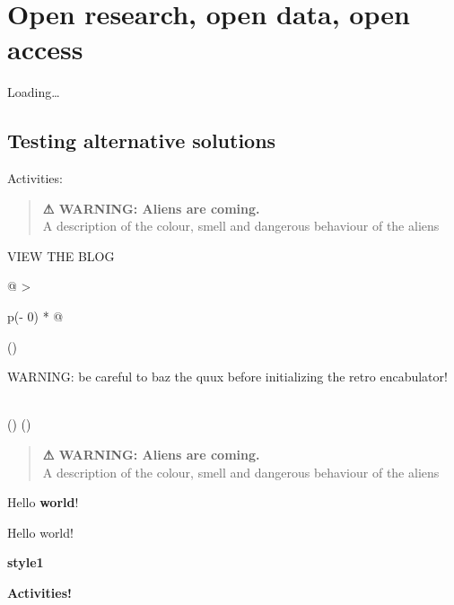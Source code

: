 \documentclass[
]{book}
\begin{document}
\hypertarget{open-research-open-data-open-access}{%
\chapter{Open research, open data, open access}\label{open-research-open-data-open-access}}

Loading\ldots{}

\hypertarget{testing-alternative-solutions}{%
\section{Testing alternative solutions}\label{testing-alternative-solutions}}

Activities:

\begin{quote}
\textbf{⚠ WARNING: Aliens are coming.}\\
A description of the colour, smell and dangerous behaviour of the aliens
\end{quote}

VIEW THE BLOG

\begin{longtable}[]{@{}
  >{\raggedright\arraybackslash}p{(\columnwidth - 0\tabcolsep) * }@{}}
\toprule()
\begin{minipage}[b]{\linewidth}\raggedright
WARNING: be careful to baz the quux before initializing the retro encabulator!
\end{minipage} \\
\midrule()
\endhead
\bottomrule()
\end{longtable}

\begin{quote}
\textbf{⚠ WARNING: Aliens are coming.}\\
A description of the colour, smell and dangerous behaviour of the aliens
\end{quote}

\leavevmode{}%
Hello \textbf{world}!

\leavevmode{}%
Hello world!

\textbf{style1}

\textbf{Activities!}
\end{document}

